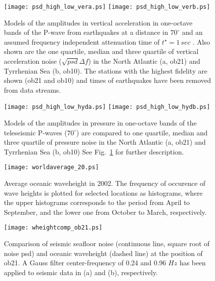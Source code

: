\documentclass{article}
\renewcommand{\includegraphics}[2][1]{{\sf Figure: {\tt #1}}}
\begin{document}
{%
\begin{figure}
\centerline{
\texttt{[image: psd\_high\_low\_vera.ps]}
\texttt{[image: psd\_high\_low\_verb.ps]}
}
\caption{
Models of the amplitudes in vertical 
acceleration in one-octave bands of the P-wave 
from earthquakes at a distance in $70^{\circ}$
and an assumed frequency independent 
attenuation time of $t^{\star} = 1 \, sec$
\cite[see][for further description]{webb:98}.
Also shown are the one quartile, median and three quartile 
of vertical acceleration noise 
($\sqrt{psd} \Delta f$)
in the 
North Atlantic (a, ob21) and 
Tyrrhenian Sea (b, ob10).
The stations with the highest fidelity are shown 
(ob21 and ob10) and times of earthquakes have been removed from 
data streams.
}
\label{high_and_low}
\end{figure}

\begin{figure}
\centerline{
\texttt{[image: psd\_high\_low\_hyda.ps]}
\texttt{[image: psd\_high\_low\_hydb.ps]}
}
\caption{
Models of the amplitudes in pressure 
in one-octave bands of the teleseismic 
P-waves  ($70^{\circ}$)
are compared to one quartile, median and 
three quartile of 
pressure noise in the 
North Atlantic (a, ob21) and Tyrrhenian Sea (b, ob10)
See Fig.~\ref{high_and_low} for further description.
}
\label{high_and_low_hyd}
\end{figure}

\begin{figure}
\centerline{\texttt{[image: worldaverage\_20.ps]}}
\caption{Average oceanic waveheight in 2002.
The frequency of occurence of wave heights is plotted for selected locations
as histograms,
where the upper histograms corresponds to the period from April to September,
and the lower one from October to March, respectively.
}
\label{worldaverage_20_rot}
\end{figure}


\begin{figure}
\centerline{
\texttt{[image: wheightcomp\_ob21.ps]}
}
\caption{
}
\label{wheightcomp}
Comparison of seismic seafloor noise (continuous line, square root of noise psd) and 
oceanic waveheight (dashed line) at the position of ob21.
A Gauss filter center-frequency of 0.24 and 0.96 $Hz$ has been 
applied to seismic data in (a) and (b), respectively.
\end{figure}

}
\end{document}
